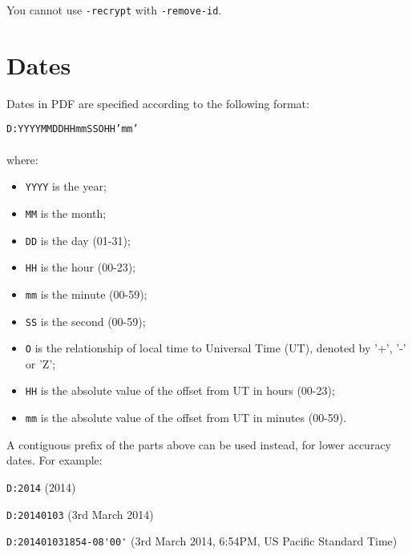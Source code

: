 \documentclass{book}
\begin{document}
You cannot use \texttt{-recrypt} with \texttt{-remove-id}.

\appendix
\chapter{Dates}
\label{dates}
Dates in PDF are specified according to the following format:

\begin{framed}
\texttt{D:YYYYMMDDHHmmSSOHH'mm'}\\\\where:

\begin{itemize}
  \item \texttt{YYYY} is the year;
  \item \texttt{MM} is the month;
  \item \texttt{DD} is the day (01-31);
  \item \texttt{HH} is the hour (00-23);
  \item \texttt{mm} is the minute (00-59);
  \item \texttt{SS} is the second (00-59);
  \item \texttt{O} is the relationship of local time to Universal Time (UT), denoted by '+', '-' or 'Z';
  \item \texttt{HH} is the absolute value of the offset from UT in hours (00-23);
  \item \texttt{mm} is the absolute value of the offset from UT in minutes (00-59).
\end{itemize}
\end{framed}

\noindent A contiguous prefix of the parts above can be used instead, for lower
accuracy dates. For example:

\begin{framed}
   \small\noindent\verb!D:2014! (2014)
   
   \vspace{1.5mm}
   \noindent\verb!D:20140103! (3rd March 2014)

   \vspace{1.5mm}
   \noindent\verb!D:201401031854-08'00'! (3rd March 2014, 6:54PM, US Pacific Standard Time)
   
\end{framed}
 
\backmatter
\printindex
\end{document}
